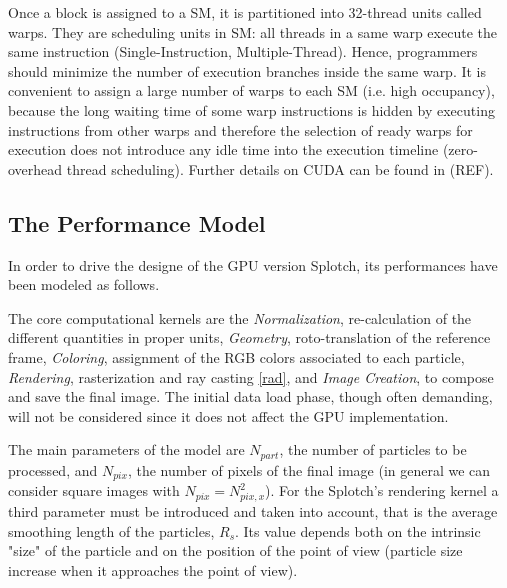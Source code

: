 \documentclass[11pt]{article}
\begin{document}
Once a block is assigned to a SM, it is partitioned into 32-thread units called warps. They are scheduling units in SM:
all threads in a same warp execute the same instruction (Single-Instruction, Multiple-Thread). Hence, programmers should minimize the number of execution branches inside the same warp. It is convenient to assign a large number of warps to each SM (i.e. high occupancy), because the long waiting time of some warp instructions is hidden by executing instructions from other warps  and therefore the selection of ready warps for execution does not introduce any idle time into the execution timeline (zero-overhead thread scheduling). Further details on CUDA can be found in (REF).

\subsection{The Performance Model}

In order to drive the designe of the GPU version Splotch, its performances have been modeled
as follows.

The core computational kernels are the {\it Normalization}, re-calculation
of the different quantities in proper units, {\it Geometry}, roto-translation 
of the reference frame, {\it Coloring}, assignment of the RGB colors associated to each 
particle,  {\it Rendering},
rasterization and ray casting \eqref{rad}, 
and {\it Image Creation}, to compose and save 
the final image. The initial data load phase, though often demanding, will not be considered
since it does not affect the GPU implementation.

The main parameters of the model are $N_{part}$, the number of particles
to be processed, and $N_{pix}$, the number of pixels of the final image
(in general we can consider square images with $N_{pix}=N_{pix,x}^2$). For 
the Splotch's rendering kernel a third parameter must be introduced and
taken into account, that is the average smoothing length of the particles,
$R_s$. Its value depends both on the intrinsic "size" of the particle
and on the position of the point of view (particle size increase when it approaches 
the point of view).

\end{document}
